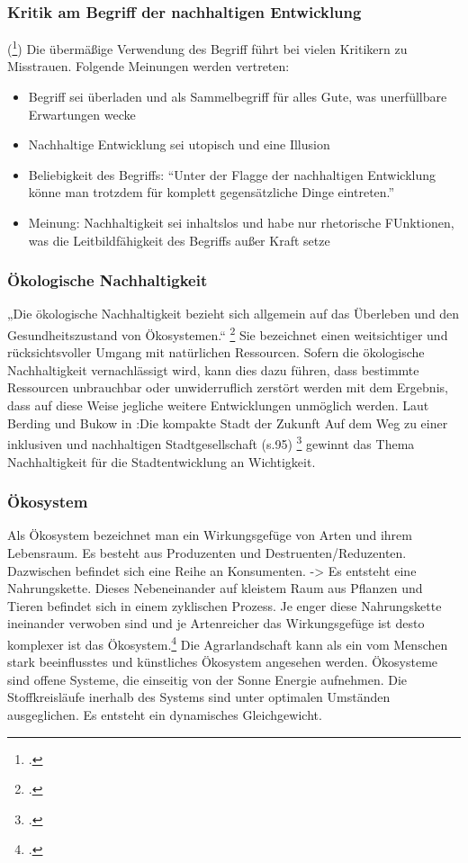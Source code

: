 \documentclass{article}
\begin{document}
\subsubsection{Kritik am Begriff der nachhaltigen Entwicklung}(\footcite{NachhaltigeBrockhaus.de})
Die übermäßige Verwendung des Begriff führt bei vielen Kritikern zu Misstrauen. Folgende Meinungen werden vertreten:

\begin{itemize}
\item Begriff sei überladen und als Sammelbegriff für alles Gute, was unerfüllbare Erwartungen wecke
\item Nachhaltige Entwicklung sei utopisch und eine Illusion
\item Beliebigkeit des Begriffs: “Unter der Flagge der nachhaltigen Entwicklung könne man trotzdem für komplett gegensätzliche Dinge eintreten.”
\item Meinung: Nachhaltigkeit sei inhaltslos und habe nur rhetorische FUnktionen, was die Leitbildfähigkeit des Begriffs außer Kraft setze
\end{itemize}

\subsubsection{Ökologische Nachhaltigkeit}
„Die ökologische Nachhaltigkeit bezieht sich allgemein auf das Überleben und den Gesundheitszustand von Ökosystemen.“ \footcite{DefinitionWirtschaftslexikonc}  Sie bezeichnet einen weitsichtiger und rücksichtsvoller Umgang mit natürlichen Ressourcen. Sofern die ökologische Nachhaltigkeit vernachlässigt wird, kann dies dazu führen, dass bestimmte Ressourcen unbrauchbar oder unwiderruflich zerstört werden mit dem Ergebnis, dass auf diese Weise jegliche weitere Entwicklungen unmöglich werden. Laut Berding und Bukow in :Die kompakte Stadt der Zukunft Auf dem Weg zu einer inklusiven und nachhaltigen Stadtgesellschaft (s.95) \footcite{BerdingWolf-DietrichBukowKarinCudakHrsgDieStadtgesellschaft} gewinnt das Thema Nachhaltigkeit für die Stadtentwicklung an Wichtigkeit. 



\subsubsection{Ökosystem}
Als Ökosystem bezeichnet man ein Wirkungsgefüge von Arten und ihrem Lebensraum. Es besteht aus Produzenten und Destruenten/Reduzenten. Dazwischen befindet sich eine Reihe an Konsumenten. -> Es entsteht eine Nahrungskette. Dieses Nebeneinander auf kleistem Raum aus Pflanzen und Tieren befindet sich in einem zyklischen Prozess. Je enger diese Nahrungskette ineinander verwoben sind und je Artenreicher das Wirkungsgefüge ist desto komplexer ist das Ökosystem.\footcite{NachhaltigeBrockhaus.de} Die Agrarlandschaft kann als ein vom Menschen stark beeinflusstes und künstliches Ökosystem angesehen werden.
Ökosysteme sind offene Systeme, die einseitig von der Sonne Energie aufnehmen. Die Stoffkreisläufe inerhalb des Systems sind unter optimalen Umständen ausgeglichen. Es entsteht ein dynamisches Gleichgewicht.
\end{document}
